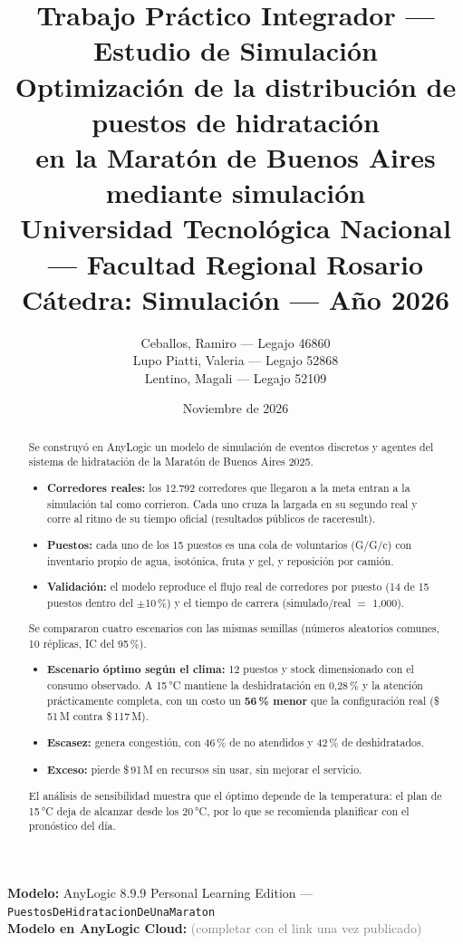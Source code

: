 \documentclass[11pt,a4paper]{article}
\title{
    \textbf{Trabajo Práctico Integrador — Estudio de Simulación} \\
    \large Optimización de la distribución de puestos de hidratación \\
    \large en la Maratón de Buenos Aires mediante simulación \\
    \vspace{0.3cm}
    \normalsize Universidad Tecnológica Nacional — Facultad Regional Rosario \\
    Cátedra: Simulación — Año 2026
}
\author{
    Ceballos, Ramiro — Legajo 46860 \\
    Lupo Piatti, Valeria — Legajo 52868 \\
    Lentino, Magali — Legajo 52109
}
\date{Noviembre de 2026}
\begin{document}
\maketitle

\begin{center}
\textbf{Modelo:} AnyLogic 8.9.9 Personal Learning Edition — \texttt{PuestosDeHidratacionDeUnaMaraton} \\[4pt]
\textbf{Modelo en AnyLogic Cloud:} \textcolor{gray}{(completar con el link una vez publicado)}
\end{center}

\begin{abstract}
Se construyó en AnyLogic un modelo de simulación de eventos discretos y agentes del sistema
de hidratación de la Maratón de Buenos Aires 2025.
\begin{itemize}
    \item \textbf{Corredores reales:} los 12.792 corredores que llegaron a la meta entran a la simulación tal como corrieron. Cada uno cruza la largada en su segundo real y corre al ritmo de su tiempo oficial (resultados públicos de raceresult).
    \item \textbf{Puestos:} cada uno de los 15 puestos es una cola de voluntarios (G/G/c) con inventario propio de agua, isotónica, fruta y gel, y reposición por camión.
    \item \textbf{Validación:} el modelo reproduce el flujo real de corredores por puesto (14 de 15 puestos dentro del $\pm$10\,\%) y el tiempo de carrera (simulado/real $=$ 1,000).
\end{itemize}
Se compararon cuatro escenarios con las mismas semillas (números aleatorios comunes, 10 réplicas, IC del 95\,\%).
\begin{itemize}
    \item \textbf{Escenario óptimo según el clima:} 12 puestos y stock dimensionado con el consumo observado. A 15\,°C mantiene la deshidratación en 0,28\,\% y la atención prácticamente completa, con un costo un \textbf{56\,\% menor} que la configuración real (\$\,51\,M contra \$\,117\,M).
    \item \textbf{Escasez:} genera congestión, con 46\,\% de no atendidos y 42\,\% de deshidratados.
    \item \textbf{Exceso:} pierde \$\,91\,M en recursos sin usar, sin mejorar el servicio.
\end{itemize}
El análisis de sensibilidad muestra que el óptimo depende de la temperatura: el plan de 15\,°C deja de alcanzar desde los 20\,°C, por lo que se recomienda planificar con el pronóstico del día.
\end{abstract}
\end{document}
